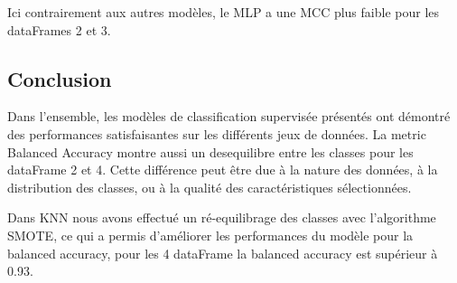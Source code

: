 Ici contrairement aux autres modèles, le MLP a une MCC plus faible pour les dataFrames 2 et 3.

\subsection{Conclusion}
Dans l'ensemble, les modèles de classification supervisée présentés ont démontré des performances satisfaisantes sur les différents jeux de données. 
La metric Balanced Accuracy montre aussi un desequilibre entre les classes pour les dataFrame 2 et 4. Cette différence peut être due à la nature des données, à la distribution des classes, ou à la qualité des caractéristiques sélectionnées.

Dans KNN nous avons effectué un ré-equilibrage des classes avec l'algorithme SMOTE, ce qui a permis d'améliorer les performances du modèle pour la balanced accuracy, pour les 4 dataFrame la balanced accuracy est supérieur à 0.93.